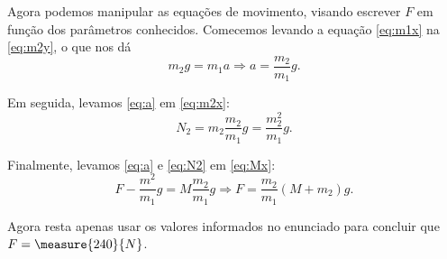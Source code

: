 \begin{question}
\begin{solution}
\begin{enumerate}
			Agora podemos manipular as equações de movimento, visando escrever $F$ em função dos parâmetros conhecidos.
			Comecemos levando a equação \ref{eq:m1x} na \eqref{eq:m2y}, o que nos dá
			\begin{equation}\label{eq:a}
				m_2 g = m_1 a
					\Rightarrow
				a = \frac{m_2}{m_1}g.
			\end{equation}

			Em seguida, levamos \eqref{eq:a} em \eqref{eq:m2x}:
			\begin{equation}\label{eq:N2}
				N_2 = m_2 \frac{m_2}{m_1}g = \frac{m_2^2}{m_1}g.
			\end{equation}

			Finalmente, levamos \eqref{eq:a} e \eqref{eq:N2} em \eqref{eq:Mx}:
			\begin{equation*}
				F - \frac{m^2}{m_1}g = M\frac{m_2}{m_1}g
					\Rightarrow
				F = \frac{m_2}{m_1}\left(M + m_2\right)g.
			\end{equation*}

			Agora resta apenas usar os valores informados no enunciado para concluir que $F = \measure{240}{N}$.

		\end{enumerate}
	\end{solution}
\end{question}